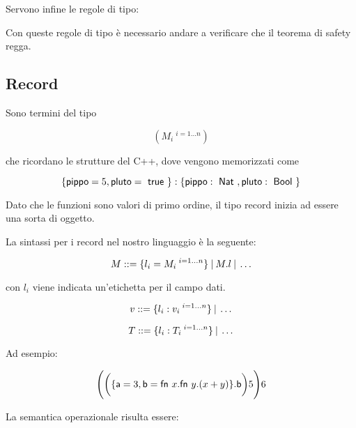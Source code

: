 Servono infine le regole di tipo:

\begin{prooftree}
\end{prooftree}

\begin{prooftree}
\end{prooftree}

\begin{prooftree}
\end{prooftree}

\noindent Con queste regole di tipo è necessario andare a verificare che il teorema di safety regga.

\subsection{Record}

Sono termini del tipo

$$
(M_i\:^{i = 1 \ldots n})
$$

\noindent che ricordano le strutture del C++, dove vengono memorizzati come

$$
\{\text{pippo} =5 , \text{pluto} = \true \} : \{ \text{pippo}: \Nat , \text{pluto} : \Bool \}
$$

\noindent Dato che le funzioni sono valori di primo ordine, il tipo record inizia ad essere una sorta di oggetto.

La sintassi per i record nel nostro linguaggio è la seguente:

$$
M ::= \{l_i = M_i \:^{i = 1 \ldots n}\} \vbar M.l \vbar \ldots
$$

\noindent con $l_i$ viene indicata un'etichetta per il campo dati.

$$
v ::= \{l_i : v_i  \:^{i = 1 \ldots n} \} \vbar \ldots
$$

$$
T ::= \{ l_i : T_i  \:^{i = 1 \ldots n} \} \vbar \ldots
$$

\noindent Ad esempio:

$$
\Bigg(\bigg(\{ \text{a} = 3, \text{b} = \fn x.\fn y. (x+y) \}.\text{b} \bigg) 5 \Bigg) 6
$$

La semantica operazionale risulta essere:

\begin{prooftree}
\end{prooftree}

